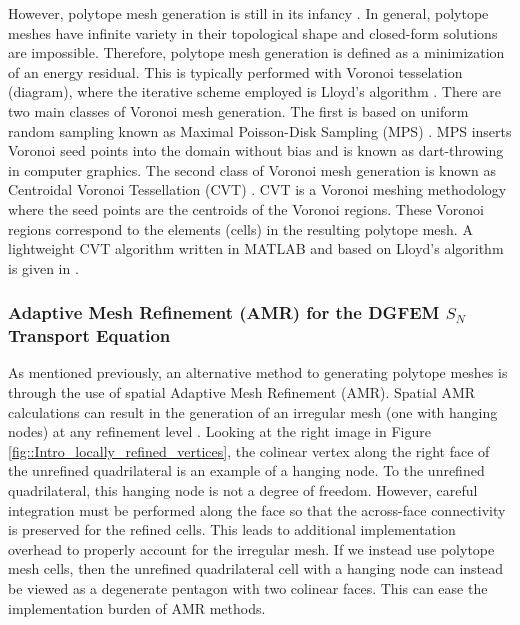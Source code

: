 However, polytope mesh generation is still in its infancy \cite{yip2005automated,sieger2010optimizing,ebeida2011uniform}. In general, polytope meshes have infinite variety in their topological shape and closed-form solutions are impossible. Therefore, polytope mesh generation is defined as a minimization of an energy residual. This is typically performed with Voronoi tesselation (diagram), where the iterative scheme employed is Lloyd's algorithm \cite{lloyd1982least,linde1980algorithm}. There are two main classes of Voronoi mesh generation. The first is based on uniform random sampling known as Maximal Poisson-Disk Sampling (MPS) \cite{ebeida2011uniform,ebeida2011efficient,ebeida2012simple}. MPS inserts Voronoi seed points into the domain without bias and is known as dart-throwing in computer graphics. The second class of Voronoi mesh generation is known as Centroidal Voronoi Tessellation (CVT) \cite{du1999centroidal,valette2004approximated}. CVT is a Voronoi meshing methodology where the seed points are the centroids of the Voronoi regions. These Voronoi regions correspond to the elements (cells) in the resulting polytope mesh. A lightweight CVT algorithm written in MATLAB and based on Lloyd's algorithm is given in \cite{talischi2012polymesher}.

\subsubsection{Adaptive Mesh Refinement (AMR) for the DGFEM $S_N$ Transport Equation}
\label{sec::Intro_Past_Polytopes_AMR}

As mentioned previously, an alternative method to generating polytope meshes is through the use of spatial Adaptive Mesh Refinement (AMR). Spatial AMR calculations can result in the generation of an irregular mesh (one with hanging nodes) at any refinement level \cite{carey1997computational,plewa2005adaptive}. Looking at the right image in Figure \ref{fig::Intro_locally_refined_vertices}, the colinear vertex along the right face of the unrefined quadrilateral is an example of a hanging node. To the unrefined quadrilateral, this hanging node is not a degree of freedom. However, careful integration must be performed along the face so that the across-face connectivity is preserved for the refined cells. This leads to additional implementation overhead to properly account for the irregular mesh. If we instead use polytope mesh cells, then the unrefined quadrilateral cell with a hanging node can instead be viewed as a degenerate pentagon with two colinear faces. This can ease the implementation burden of AMR methods.


